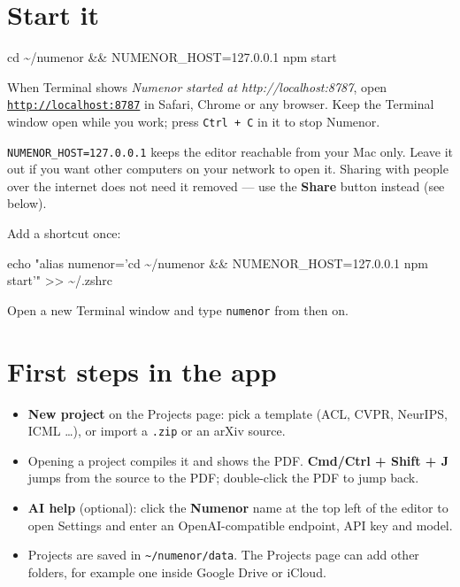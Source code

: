 \documentclass[11pt,a4paper]{article}
\begin{document}
\section{Start it}
\begin{term}
cd \textasciitilde/numenor \&\& NUMENOR\_HOST=127.0.0.1 npm start
\end{term}
When Terminal shows \textit{Numenor started at http://localhost:8787}, open
\href{http://localhost:8787}{\texttt{http://localhost:8787}} in Safari, Chrome or any browser.
Keep the Terminal window open while you work; press \texttt{Ctrl + C} in it to stop Numenor.

\texttt{NUMENOR\_HOST=127.0.0.1} keeps the editor reachable from your Mac only. Leave it out if you want other
computers on your network to open it. Sharing with people over the internet does not need it removed ---
use the \textbf{Share} button instead (see below).

\begin{note}
Add a shortcut once:
\par\smallskip
\begin{tcolorbox}[colback=navy,colframe=navy,coltext=white,arc=2pt,fontupper=\ttfamily\small,left=6pt,top=3pt,bottom=3pt]
{\scriptsize echo "alias numenor='cd \textasciitilde/numenor \&\& NUMENOR\_HOST=127.0.0.1 npm start'" >> \textasciitilde/.zshrc}
\end{tcolorbox}
Open a new Terminal window and type \texttt{numenor} from then on.
\end{note}

\section{First steps in the app}
\begin{itemize}[leftmargin=1.2em,itemsep=0.2em]
\item \textbf{New project} on the Projects page: pick a template (ACL, CVPR, NeurIPS, ICML \dots), or import a \texttt{.zip} or an arXiv source.
\item Opening a project compiles it and shows the PDF. \textbf{Cmd/Ctrl + Shift + J} jumps from the source to the PDF; double-click the PDF to jump back.
\item \textbf{AI help} (optional): click the \textbf{Numenor} name at the top left of the editor to open Settings and enter
an OpenAI-compatible endpoint, API key and model.
\item Projects are saved in \texttt{\textasciitilde/numenor/data}. The Projects page can add other folders, for example one inside Google Drive or iCloud.
\end{itemize}
\end{document}
